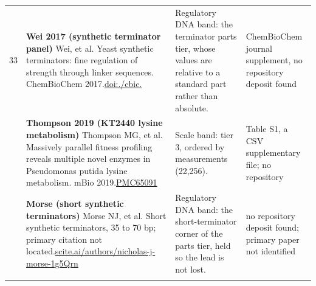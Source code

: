 \begin{landscape}
\begin{longtable}{@{}r@{\hspace{4pt}} L{78mm} L{72mm} L{76mm}@{}}
33 & \textbf{Wei 2017 (synthetic terminator panel)} \newline Wei, et al. Yeast synthetic terminators: fine regulation of strength through linker sequences. ChemBioChem 2017.\newline \href{https://doi.org/10.1002/cbic.201700516}{doi:./\allowbreak cbic.} & Regulatory DNA band: the terminator parts tier, whose values are relative to a standard part rather than absolute. & ChemBioC\allowbreak hem jour\allowbreak nal supp\allowbreak lement, \allowbreak no repos\allowbreak itory de\allowbreak posit fo\allowbreak und \\
 & \textbf{Thompson 2019 (KT2440 lysine metabolism)} \newline Thompson MG, et al. Massively parallel fitness profiling reveals multiple novel enzymes in Pseudomonas putida lysine metabolism. mBio 2019.\newline \href{https://pmc.ncbi.nlm.nih.gov/articles/PMC6509195}{PMC65091} & Scale band: tier 3, ordered by measurements (22,256). & Table S1\allowbreak , a CSV \allowbreak suppleme\allowbreak ntary fi\allowbreak le; no r\allowbreak epositor\allowbreak y \\
 & \textbf{Morse (short synthetic terminators)} \newline Morse NJ, et al. Short synthetic terminators, 35 to 70 bp; primary citation not located.\newline \href{https://scite.ai/authors/nicholas-j-morse-1g5Qrn}{scite.\allowbreak ai/\allowbreak authors\allowbreak /\allowbreak nichola\allowbreak s-\allowbreak j-\allowbreak morse-\allowbreak 1g5Qrn} & Regulatory DNA band: the short-terminator corner of the parts tier, held so the lead is not lost. & no repos\allowbreak itory de\allowbreak posit fo\allowbreak und; pri\allowbreak mary pap\allowbreak er not i\allowbreak dentifie\allowbreak d \\
\addlinespace[5pt]

\end{longtable}
\end{landscape}
